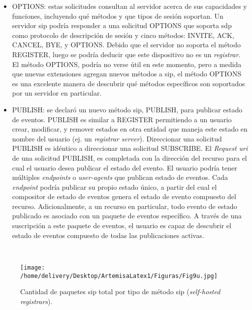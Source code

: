\documentclass[a4paper,12pt]{report}
\begin{document}
{\begin{itemize}
\item OPTIONS: estas solicitudes consultan al servidor acerca de sus capacidades
y funciones, incluyendo qué métodos y que tipos de sesión soportan. Un
servidor \ac{sip} podría responder a una solicitud OPTIONS que soporta \ac{sdp} como
protocolo de descripción de sesión y cinco métodos: INVITE,
ACK, CANCEL, BYE, y OPTIONS. Debido que el servidor no soporta el método
REGISTER, luego se podría deducir que este dispositivo no es un \emph{registrar}. El
método OPTIONS, podría no verse útil en este momento, pero a medida que
nuevas extensiones agregan nuevos métodos a \ac{sip}, el método OPTIONS es una
excelente manera de descubrir qué métodos específicos son soportados por un
servidor en particular.
\end{itemize}

\cite{camarillo}

\begin{itemize}
\item PUBLISH: se declaró un nuevo método \ac{sip}, PUBLISH, para publicar estado de eventos.
PUBLISH es similar a REGISTER permitiendo a un usuario crear, modificar, y
remover estados en otra entidad que maneja este estado en nombre del usuario
(ej. un \emph{registrar server}). Direccionar una solicitud PUBLISH es idéntico a
direccionar una solicitud \mbox{SUBSCRIBE}. El \emph{Request \ac{uri}} de una
solicitud PUBLISH, es completada con la dirección del recurso para el cual el
usuario desea publicar el estado del evento. El usuario podría tener múltiples
\emph{endpoints} o \emph{user-agents} que publican estado de eventos. Cada
\emph{endpoint} podría publicar su propio estado único, a partir del cual el
compositor de estado de eventos genera el estado de evento compuesto del
recurso. Adicionalmente, a un recurso en particular, todo evento de estado
publicado es asociado con un paquete de eventos específico. A través de una
suscripción a este paquete de eventos, el usuario es capaz de descubrir el
estado de eventos compuesto de todas las publicaciones activas.  
\end{itemize}

\cite{niemi}\\

\begin{figure}[h!] 
\centering
\texttt{[image: /home/delivery/Desktop/ArtemisaLatex1/Figuras/Fig9u.jpg]}
\caption{Cantidad de paquetes \ac{sip} total por tipo de método \ac{sip}
(\emph{self-hosted} \emph{registrars}).}
\label{cant_paq_sip_x_metodo_barras_reg_sh}
\end{figure}

}
\end{document}
